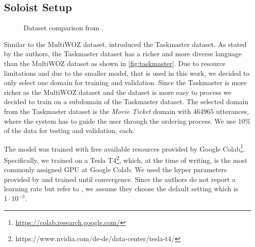 \documentclass[twocolumn]{tum-article}
\begin{document}
\subsection{Soloist Setup}\label{sec:soloist_setup}
\begin{figure}[!h]
\centering
{}
\caption{Dataset comparison from \cite{byrne2019taskmaster}.}
\label{fig:taskmaster}
\end{figure}
Similar to the MultiWOZ dataset, \cite{byrne2019taskmaster} introduced the Taskmaster dataset. As stated by the authors, the Taskmaster dataset has a richer and more diverse language than the MultiWOZ dataset as shown in \autoref{fig:taskmaster}. Due to resource limitations and due to the smaller model, that is used in this work, we decided to only select one domain for training and validation. Since the Taskmaster is more richer as the MultiWOZ dataset and the dataset is more easy to process we decided to train on a subdomain of the Taskmaster dataset. The selected domain from the Taskmaster dataset is the \textit{Movie Ticket} domain with $464965$ utterances, where the system has to guide the user through the ordering process. We use $10\%$ of the data for testing and validation, each. 

The model was trained with free available resources provided by Google Colab\footnote{\url{https://colab.research.google.com/}}. Specifically, we trained on a Tesla T4\footnote{https://www.nvidia.com/de-de/data-center/tesla-t4/}, which, at the time of writing, is the most commonly assigned GPU at Google Colab. We used the hyper parameters provided by \cite{peng2020soloist} and trained until convergence. Since the authors do not report a learning rate but refer to \cite{kingma2014adam}, we assume they choose the default setting which is $1\cdot 10^{-3}$. 
\end{document}
